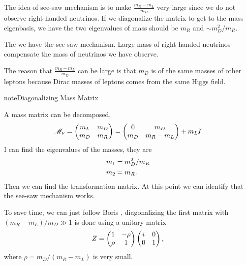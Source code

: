 \documentclass[letterpaper,12pt,english]{sphinxmanual}
\begin{document}
The idea of see-saw mechanism is to make \(\frac{m_R-m_L}{m_D}\) very large since we do not observe right-handed neutrinos. If we diagonalize the matrix to get to the mass eigenbasis, we have the two eigenvalues of mass should be \(m_R\) and \(\sim m_D^2/m_R\).

The we have the see-saw mechanism. Large mass of right-handed neutrinos compensate the mass of neutrinos we have observe.

The reason that \(\frac{m_R-m_L}{m_D}\) can be large is that \(m_D\) is of the same masses of other leptons because Dirac masses of leptons comes from the same Higgs field.

\begin{notice}{note}{Diagonalizing Mass Matrix}

A mass matrix can be decomposed,
\begin{gather}
\begin{split}\mathscr{M}_\nu = \begin{pmatrix} m_L & m_D \\ m_D & m_R \end{pmatrix} = \begin{pmatrix} 0 & m_D \\ m_D & m_R-m_L \end{pmatrix} + m_L I\end{split}\notag
\end{gather}
I can find the eigenvalues of the masses, they are
\begin{gather}
\begin{split}m_1 & = m_D^2/m_R \\
m_2 & = m_R.\end{split}\notag
\end{gather}
Then we can find the transformation matrix. At this point we can identify that the see-saw mechanism works.

To save time, we can just follow Boris \footnotemark[2] , diagonalizing the first matrix with \((m_R-m_L)/m_D \gg 1\) is done using a unitary matrix
\begin{gather}
\begin{split}Z = \begin{pmatrix} 1 & -\rho \\ \rho & 1  \end{pmatrix} \begin{pmatrix} i & 0 \\ 0 & 1 \end{pmatrix},\end{split}\notag
\end{gather}
where \(\rho=m_D/(m_R-m_L)\) is very small.


\end{notice}
\end{document}

